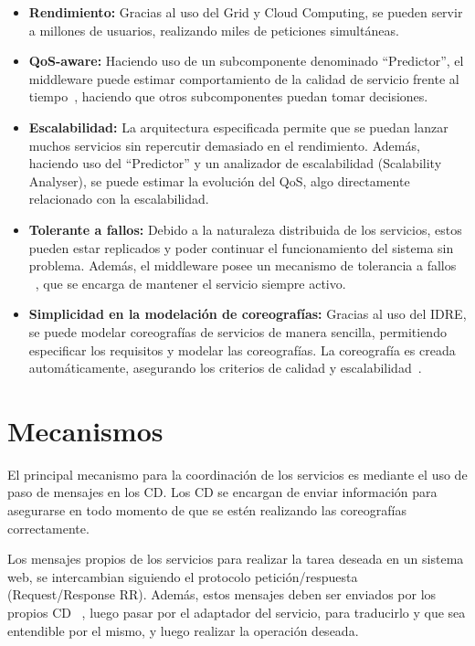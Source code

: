 \documentclass[runningheads]{llncs}
\begin{document}
\begin{itemize}
    \item \textbf{Rendimiento: }Gracias al uso del Grid y Cloud Computing, se pueden servir a millones de usuarios, realizando miles de peticiones simultáneas.~\cite{a_1}
    \item \textbf{QoS-aware: }Haciendo uso de un subcomponente denominado ``Predictor'', el middleware puede estimar comportamiento de la calidad de servicio frente al tiempo~\cite{a_10}, haciendo que otros subcomponentes puedan tomar decisiones. 
    \item \textbf{Escalabilidad: }La arquitectura especificada permite que se puedan lanzar muchos servicios sin repercutir demasiado en el rendimiento. Además, haciendo uso del ``Predictor'' y un analizador de escalabilidad (Scalability Analyser), se puede estimar la evolución del QoS, algo directamente relacionado con la escalabilidad. ~\cite{a_10}
    \item \textbf{Tolerante a fallos: }Debido a la naturaleza distribuida de los servicios, estos pueden estar replicados y poder continuar el funcionamiento del sistema sin problema. Además, el middleware posee un mecanismo de tolerancia a fallos ~\cite{a_20}, que se encarga de mantener el servicio siempre activo.
    \item \textbf{Simplicidad en la modelación de coreografías: }Gracias al uso del IDRE, se puede modelar coreografías de servicios de manera sencilla, permitiendo especificar los requisitos y modelar las coreografías. La coreografía es creada automáticamente, asegurando los criterios de calidad y escalabilidad~\cite{a_2}.
\end{itemize}
\section{Mecanismos}
El principal mecanismo para la coordinación de los servicios es mediante el uso de paso de mensajes en los CD. Los CD se encargan de enviar información para asegurarse en todo momento de que se estén realizando las coreografías correctamente. 

Los mensajes propios de los servicios para realizar la tarea deseada en un sistema web, se intercambian siguiendo el protocolo petición/respuesta (Request/Response RR). Además, estos mensajes deben ser enviados por los propios CD ~\cite{a_2}, luego pasar por el adaptador del servicio, para traducirlo y que sea entendible por el mismo, y luego realizar la operación deseada.
\end{document}

